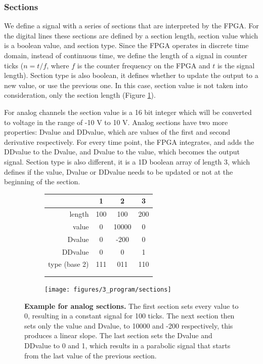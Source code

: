 \documentclass{tdk_style}
\begin{document}
\subsubsection{Sections}
We define a signal with a series of sections that are interpreted by the FPGA. For the digital lines these sections are defined by a section length, section value which is a boolean value, and section type. Since the FPGA operates in discrete time domain, instead of continuous time, we define the length of a signal in counter ticks ($n=t/f$, where $f$ is the counter frequency on the FPGA and $t$ is the signal length). Section type is also boolean, it defines whether to update the output to a new value, or use the previous one. In this case, section value is not taken into consideration, only the section length (Figure \ref{fig:sections}).

For analog channels the section value is a 16 bit integer which will be converted to voltage in the range of -10 V to 10 V. Analog sections have two more properties: Dvalue and DDvalue, which are values of the first and second derivative respectively. For every time point, the FPGA integrates, and adds the DDvalue to the Dvalue, and Dvalue to the value, which becomes the output signal. Section type is also different, it is a 1D boolean array of length 3, which defines if the value, Dvalue or DDvalue needs to be updated or not at the beginning of the section.

\begin{figure}[htbp]
\centering
\begin{subfigure}[b]{0.49\textwidth}
		\centering
		\begin{tabular}{r|c|c|c}
			& 1 & 2 & 3 \\ \hline \hline
	length  & 100 & 100 & 200 \\
	value   & 0 & 10000 & 0 \\
	Dvalue  & 0 & -200 & 0 \\
	DDvalue & 0 & 0 & 1 \\
	type (base 2) & 111 & 011 & 110 \\
	\multicolumn{4}{c}{ }\\ %
\multicolumn{4}{c}{ }\\ %
\end{tabular}
		\caption{}
	\end{subfigure}	
	\begin{subfigure}[b]{0.49\textwidth}
		\centering
		\texttt{[image: figures/3\_program/sections]}
		\caption{}
	\end{subfigure}
\caption{\textbf{Example for analog sections.} The first section sets every value to 0, resulting in a constant signal for 100 ticks. The next section then sets only the value and Dvalue, to 10000 and -200 respectively, this produces a linear slope. The last section sets the Dvalue and DDvalue to 0 and 1, which results in a parabolic signal that starts from the last value of the previous section.}
\label{fig:sections}
\end{figure}
\end{document}
